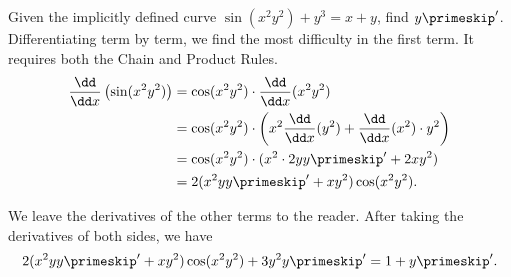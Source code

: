 \begin{example}\label{ex_implicit5}
Given the implicitly defined curve $\sin(x^2y^2)+y^3=x+y$, find $y\primeskip'$.
\solution
Differentiating term by term, we find the most difficulty in the first term.  It requires both the Chain and Product Rules.
\begin{align*}
	\frac{\dd}{\dd x}\left(\sin (x^2y^2)\right)
	&= \cos(x^2y^2) \cdot \frac{\dd}{\dd x} (x^2y^2)\\
	&= \cos(x^2y^2) \cdot \left(x^2 \frac{\dd}{\dd x} (y^2)
	+ \frac{\dd}{\dd x} (x^2) \cdot y^2\right)\\
	&= \cos(x^2y^2) \cdot (x^2 \cdot 2yy\primeskip'+2xy^2)\\
	&= 2(x^2yy\primeskip'+xy^2)\cos(x^2y^2). \\
\end{align*}

We leave the derivatives of the other terms to the reader. After taking the derivatives of both sides, we have
\[2(x^2yy\primeskip'+xy^2)\cos(x^2y^2) + 3y^2y\primeskip' = 1 + y\primeskip'.\]


\end{example}
